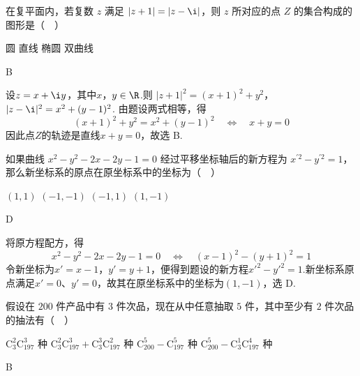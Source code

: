\documentclass[UTF8,a4paper,oneside,11pt]{ctexbook}
\begin{document}
\begin{problem}

在复平面内，若复数 \(z\) 满足 \(|z + 1| = |z - \i|\)，则 \(z\) 所对应的点 \(Z\) 的集合构成的图形是（\(\quad\)）

\choices
    {圆}
    {直线}
    {椭圆}
    {双曲线}
\end{problem}

\begin{answer}
B
\end{answer}

\begin{solution}
设\(z=x+\i y\)，其中\(x\)，\(y\in\R\).则
\(|z+1|^2=(x+1)^2+y^2\)，\(|z-\i|^2=x^2+(y-1)^2\).
由题设两式相等，得
\[
(x+1)^2+y^2=x^2+(y-1)^2
\quad\Longleftrightarrow\quad
x+y=0
\]
因此点\(Z\)的轨迹是直线\(x+y=0\)，故选 B.
\end{solution}

\begin{problem}

如果曲线 \(x^{2} - y^{2} - 2x - 2y - 1 = 0\) 经过平移坐标轴后的新方程为 \(x^{\prime 2} - y^{\prime 2} = 1\)，那么新坐标系的原点在原坐标系中的坐标为（\(\quad\)）

\choices
    {\((1,1)\)}
    {\((-1, - 1)\)}
    {\((-1, 1)\)}
    {\((1, - 1)\)}
\end{problem}

\begin{answer}
D
\end{answer}

\begin{solution}
将原方程配方，得
\[
x^2-y^2-2x-2y-1=0
\quad\Longleftrightarrow\quad
(x-1)^2-(y+1)^2=1
\]
令新坐标为\(x'=x-1\)，\(y'=y+1\)，便得到题设的新方程\(x'^2-y'^2=1\).新坐标系原点满足\(x'=0\)、\(y'=0\)，故其在原坐标系中的坐标为\((1,-1)\)，选 D.
\end{solution}

\begin{problem}

假设在 \(200\) 件产品中有 \(3\) 件次品，现在从中任意抽取 \(5\) 件，其中至少有 \(2\) 件次品的抽法有（\(\quad\)）

\choices
    {\(\mathrm C_3^2\mathrm C_{197}^3\) 种}
    {\(\mathrm C_3^2\mathrm C_{197}^3 + \mathrm C_3^3\mathrm C_{197}^2\) 种}
    {\(\mathrm C_{200}^5 - \mathrm C_{197}^5\) 种}
    {\(\mathrm C_{200}^5 - \mathrm C_3^1\mathrm C_{197}^4\) 种}
\end{problem}

\begin{answer}
B
\end{answer}
\end{document}
